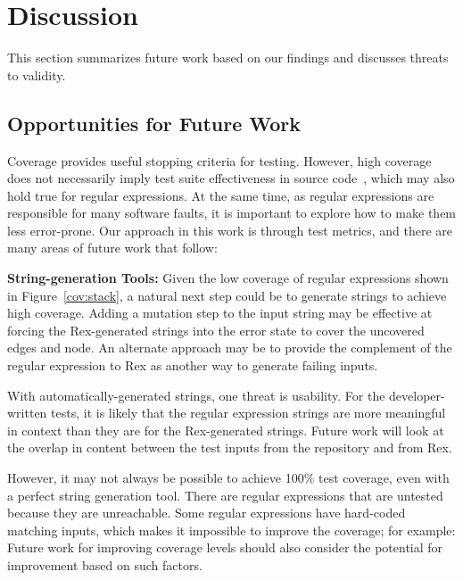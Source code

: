 \section{Discussion}
\label{sec:discussion}
This section summarizes future work based on our findings and discusses threats to validity.
\subsection{Opportunities for Future Work}
Coverage provides useful stopping criteria for testing. 
However, high coverage does not necessarily imply test suite effectiveness in source code~\cite{coveragetestsuitecorrelation}, which may also hold true for regular expressions. 
At the same time, as regular expressions are responsible for many software faults, it is important to explore how to make them less error-prone. Our approach in this work is through test metrics, and there are many areas of future work that follow:

\textbf{String-generation Tools: } 
Given the low coverage of regular expressions shown in Figure~\ref{cov:stack}, a natural next step could be to generate strings to achieve high coverage. 
Adding a mutation step to the input string may be effective at forcing the Rex-generated strings into the error state to cover the uncovered edges and node. An alternate approach may be to provide the complement of the regular expression to Rex as another way to generate failing inputs. 

With automatically-generated strings, one threat is usability. For the developer-written tests, it is likely that the regular expression strings are more meaningful in context than they are for the Rex-generated strings. Future work will look at the overlap in content between the test inputs from the repository and from Rex. 

However, it may not always be possible to achieve 100\% test coverage, even with a perfect string generation tool. There are regular expressions that are untested because they are unreachable. Some regular expressions have hard-coded matching inputs, which makes it impossible to improve the coverage; for example: 
Future work for improving coverage levels should also consider the potential for improvement based on such factors. 

